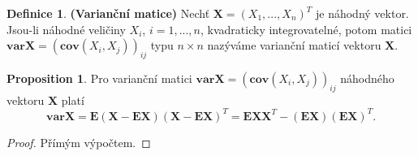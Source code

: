 \documentclass[a4]{report}
\theoremstyle{definition}
\newtheorem{definition}{Definice}[section]
\newtheorem{proposition}{Proposition}[section]
\begin{document}
{\begin{definition}{\textbf{(Varianční matice)}}
Nechť $\textbf{X} = (X_{1}, ..., X_{n})^{T}$ je náhodný vektor. Jsou-li náhodné veličiny $X_{i}$, $i = 1, ..., n$, kvadraticky integrovatelné, potom matici $\mathbf{var}\textbf{X} = (\mathbf{cov}(X_{i}, X_{j}))_{ij}$ typu $n \times n$ nazýváme varianční maticí vektoru $\textbf{X}$.
\end{definition}

\begin{proposition}\label{Tvrzeni01}
Pro varianční matici $\mathbf{var}\textbf{X} = (\mathbf{cov}(X_{i}, X_{j}))_{ij}$ náhodného vektoru $\textbf{X}$ platí
\begin{equation}
\mathbf{var}\textbf{X} = \mathbf{E}(\textbf{X} - \mathbf{E}\textbf{X})(\textbf{X} - \mathbf{E}\textbf{X})^{T} = \mathbf{E}\textbf{X}\textbf{X}^{T} - (\mathbf{E}\textbf{X})(\mathbf{E}\textbf{X})^{T}.
\end{equation}
\end{proposition}
\begin{proof}
Přímým výpočtem.
\end{proof}

}
\end{document}
